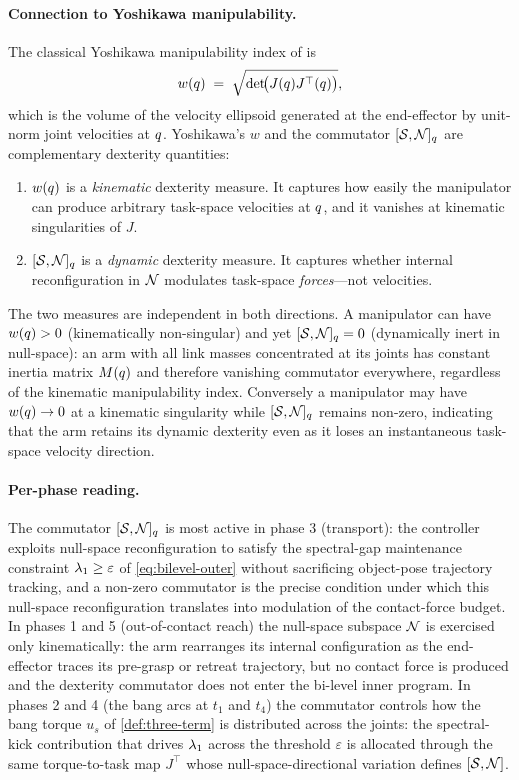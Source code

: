\paragraph{Connection to Yoshikawa manipulability.}
The classical Yoshikawa manipulability index of
\citet{Yoshikawa1985} is
\[
  w(q) \;=\; \sqrt{\det\!\bigl(J(q) J^{\top}(q)\bigr)},
\]
which is the volume of the velocity ellipsoid generated at the
end-effector by unit-norm joint velocities at $q$.
Yoshikawa's $w$ and the commutator
$[\mathcal{S}, \mathcal{N}]_{q}$ are complementary dexterity quantities:
\begin{enumerate}[label=(\roman*),nosep]
  \item $w(q)$ is a \emph{kinematic} dexterity measure.
        It captures how easily the manipulator can produce
        arbitrary task-space velocities at $q$, and it
        vanishes at kinematic singularities of $J$.
  \item $[\mathcal{S}, \mathcal{N}]_{q}$ is a \emph{dynamic} dexterity
        measure. It captures whether internal reconfiguration in
        $\mathcal{N}$ modulates task-space \emph{forces}---not
        velocities.
\end{enumerate}
The two measures are independent in both directions. A
manipulator can have $w(q) > 0$ (kinematically
non-singular) and yet $[\mathcal{S}, \mathcal{N}]_{q} = 0$ (dynamically
inert in null-space): an arm with all link masses concentrated
at its joints has constant inertia matrix $M(q)$ and
therefore vanishing commutator everywhere, regardless of the
kinematic manipulability index. Conversely a manipulator may
have $w(q) \to 0$ at a kinematic singularity while
$[\mathcal{S}, \mathcal{N}]_{q}$ remains non-zero, indicating that the
arm retains its dynamic dexterity even as it loses an
instantaneous task-space velocity direction.

\paragraph{Per-phase reading.}
The commutator $[\mathcal{S}, \mathcal{N}]_{q}$ is most active in
phase 3 (transport): the controller exploits null-space
reconfiguration to satisfy the spectral-gap maintenance
constraint $\lambda_{1} \ge \varepsilon$ of
\cref{eq:bilevel-outer} without sacrificing object-pose
trajectory tracking, and a non-zero commutator is the precise
condition under which this null-space reconfiguration translates
into modulation of the contact-force budget. In phases 1 and 5
(out-of-contact reach) the null-space subspace $\mathcal{N}$ is
exercised only kinematically: the arm rearranges its internal
configuration as the end-effector traces its pre-grasp or
retreat trajectory, but no contact force is produced and the
dexterity commutator does not enter the bi-level inner program.
In phases 2 and 4 (the bang arcs at $t_{1}$ and $t_{4}$) the
commutator controls how the bang torque $u_{s}$ of
\cref{def:three-term} is distributed across the joints: the
spectral-kick contribution that drives $\lambda_{1}$ across the
threshold $\varepsilon$ is allocated through the same
torque-to-task map $J^{\top}$ whose null-space-directional
variation defines $[\mathcal{S}, \mathcal{N}]$.

